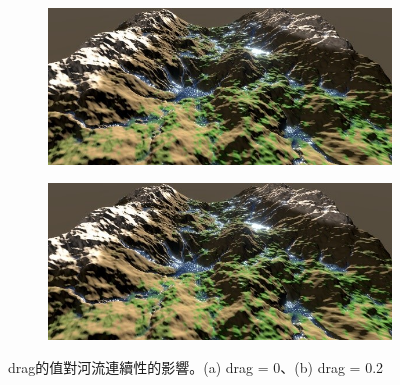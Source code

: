 \documentclass[a4paper, 12pt]{article}
\begin{document}
\begin{figure}[htbp]
  \begin{subfigure}{0.45\textwidth}
    \includegraphics[width=\linewidth]{fig/1a.jpg}
    \caption{} \label{fig:1a}
  \end{subfigure}%
  \hspace*{\fill}   %
  \begin{subfigure}{0.45\textwidth}
    \includegraphics[width=\linewidth]{fig/1a.jpg}
    \caption{} \label{fig:1b}
  \end{subfigure}%
\caption{drag的值對河流連續性的影響。(a) drag = 0、(b) drag = 0.2} \label{fig:1}
\end{figure}
\end{document}
